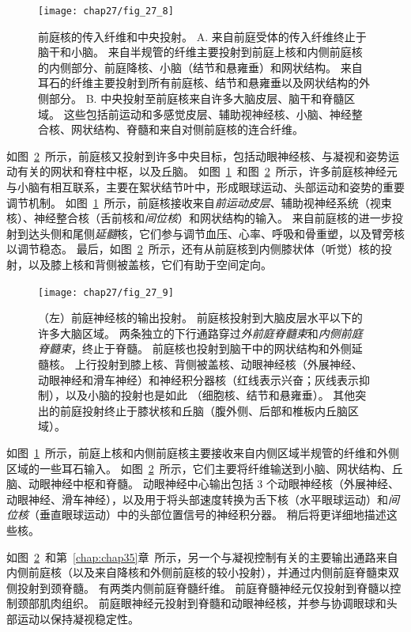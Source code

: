 \begin{figure}[htbp]
	\centering
	\texttt{[image: chap27/fig\_27\_8]}
	\caption{前庭核的传入纤维和中央投射。
		A. 来自前庭受体的传入纤维终止于脑干和小脑。
		来自半规管的纤维主要投射到前庭上核和内侧前庭核的内侧部分、前庭降核、小脑（结节和悬雍垂）和网状结构。
		来自耳石的纤维主要投射到所有前庭核、结节和悬雍垂以及网状结构的外侧部分\cite{gacek1974localization}。
		B. 中央投射至前庭核来自许多大脑皮层、脑干和脊髓区域。
		这些包括前运动和多感觉皮层、辅助视神经核、小脑、神经整合核、网状结构、脊髓和来自对侧前庭核的连合纤维。}
	\label{fig:27_8}
\end{figure}


如图~\ref{fig:27_9}~所示，前庭核又投射到许多中央目标，包括动眼神经核、与凝视和姿势运动有关的网状和脊柱中枢，以及丘脑。
如图~\ref{fig:27_8}~和图~\ref{fig:27_9}~所示，许多前庭核神经元与小脑有相互联系，主要在絮状结节叶中，形成眼球运动、头部运动和姿势的重要调节机制。
如图~\ref{fig:27_8}~所示，前庭核接收来自\textit{前运动皮层}、辅助视神经系统（视束核）、神经整合核（舌前核和\textit{间位核}）和网状结构的输入。
来自前庭核的进一步投射到达头侧和尾侧\textit{延髓}核，它们参与调节血压、心率、呼吸和骨重塑，以及臂旁核以调节稳态。
最后，如图~\ref{fig:27_9}~所示，还有从前庭核到内侧膝状体（听觉）核的投射，以及膝上核和背侧被盖核，它们有助于空间定向。


\begin{figure}[htbp]
	\centering
	\texttt{[image: chap27/fig\_27\_9]}
	\caption{（左）前庭神经核的输出投射。
		前庭核投射到大脑皮层水平以下的许多大脑区域。
		两条独立的下行通路穿过\textit{外前庭脊髓束}和\textit{内侧前庭脊髓束}，终止于脊髓。
		前庭核也投射到脑干中的网状结构和外侧延髓核。
		上行投射到膝上核、背侧被盖核、动眼神经核（外展神经、动眼神经和滑车神经）和神经积分器核（红线表示兴奋；灰线表示抑制），以及小脑的投射也是如此 （细胞核、结节和悬雍垂）。
		其他突出的前庭投射终止于膝状核和丘脑（腹外侧、后部和椎板内丘脑区域）。}
	\label{fig:27_9}
\end{figure}


如图~\ref{fig:27_8}~所示，前庭上核和内侧前庭核主要接收来自内侧区域半规管的纤维和外侧区域的一些耳石输入。
如图~\ref{fig:27_9}~所示，它们主要将纤维输送到小脑、网状结构、丘脑、动眼神经中枢和脊髓。
动眼神经中心输出包括 3 个动眼神经核（外展神经、动眼神经、滑车神经），以及用于将头部速度转换为舌下核（水平眼球运动）和\textit{间位核}（垂直眼球运动）中的头部位置信号的神经积分器。
稍后将更详细地描述这些核。


如图~\ref{fig:27_9}~和第~\ref{chap:chap35}章~所示，另一个与凝视控制有关的主要输出通路来自内侧前庭核（以及来自降核和外侧前庭核的较小投射），并通过内侧前庭脊髓束双侧投射到颈脊髓。
有两类内侧前庭脊髓纤维。
前庭脊髓神经元仅投射到脊髓以控制颈部肌肉组织。
前庭眼神经元投射到脊髓和动眼神经核，并参与协调眼球和头部运动以保持凝视稳定性。


